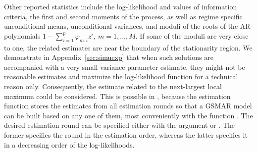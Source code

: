 \documentclass[nojss]{jss} %
\begin{document}
Other reported statistics include the log-likelihood and values of information criteria, the first and second moments of the process, as well as regime specific unconditional means, unconditional variances, and moduli of the roots of the AR polynomials $1-\sum_{i=1}^p\varphi_{m,i}z^i, \ m=1,...,M$. If some of the moduli are very close to one, the related estimates are near the boundary of the stationarity region. We demonstrate in Appendix~\ref{sec:simuexp} that when such solutions are accompanied with a very small variance parameter estimate, they might not be reasonable estimates and maximize the log-likelihood function for a technical reason only. Consequently, the estimate related to the next-largest local maximum could be considered. This is possible in , because the estimation function  stores the estimates from all estimation rounds so that a GSMAR model can be built based on any one of them, most conveniently with the function . The desired estimation round can be specified either with the argument  or . The former specifies the round in the estimation order, whereas the latter specifies it in a decreasing order of the log-likelihoods.
\end{document}
